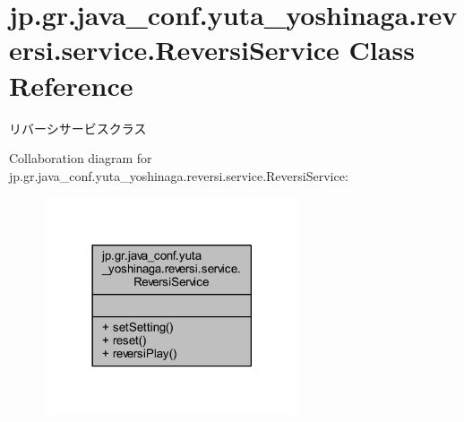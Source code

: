 \hypertarget{classjp_1_1gr_1_1java__conf_1_1yuta__yoshinaga_1_1reversi_1_1service_1_1_reversi_service}{}\section{jp.\+gr.\+java\+\_\+conf.\+yuta\+\_\+yoshinaga.\+reversi.\+service.\+Reversi\+Service Class Reference}
\label{classjp_1_1gr_1_1java__conf_1_1yuta__yoshinaga_1_1reversi_1_1service_1_1_reversi_service}


リバーシサービスクラス  




Collaboration diagram for jp.\+gr.\+java\+\_\+conf.\+yuta\+\_\+yoshinaga.\+reversi.\+service.\+Reversi\+Service\+:
\nopagebreak
\begin{figure}[H]
\begin{center}
\leavevmode
\includegraphics[width=213pt]{classjp_1_1gr_1_1java__conf_1_1yuta__yoshinaga_1_1reversi_1_1service_1_1_reversi_service__coll__graph}
\end{center}
\end{figure}
